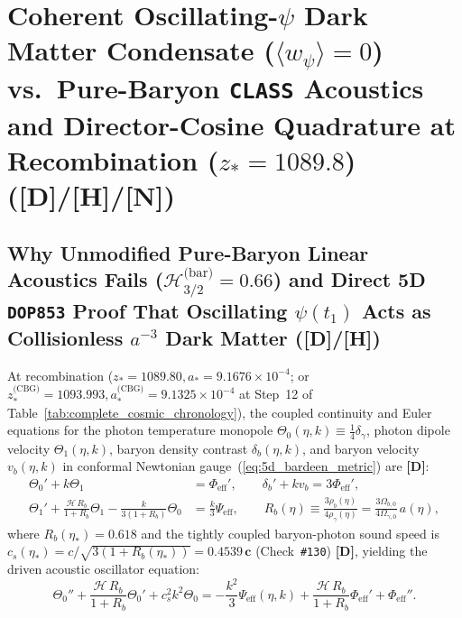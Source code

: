 \documentclass[11pt,a4paper]{article}
\newcommand{\catD}{\textbf{\textcolor{blue!75!black}{[D]}}}
\newcommand{\catH}{\textbf{\textcolor{orange!85!black}{[H]}}}
\newcommand{\catN}{\textbf{\textcolor{teal!75!black}{[N]}}}
\theoremstyle{plain}
\theoremstyle{definition}
\theoremstyle{remark}
\numberwithin{equation}{section}
\begin{document}
\section{\texorpdfstring{Coherent Oscillating-$\psi$ Dark Matter Condensate ($\langle w_{\psi}\rangle = 0$) vs.\ Pure-Baryon \texttt{CLASS} Acoustics and Director-Cosine Quadrature at Recombination ($z_* = 1089.8$) (\catD/\catH/\catN)}{Coherent Oscillating-psi Dark Matter Condensate vs. Pure-Baryon CLASS Acoustics and Director-Cosine Quadrature at Recombination}}

\subsection{\texorpdfstring{Why Unmodified Pure-Baryon Linear Acoustics Fails ($\mathcal{H}_{3/2}^{\text{(bar)}} = 0.66$) and Direct 5D \texttt{DOP853} Proof That Oscillating $\psi(t_1)$ Acts as Collisionless $a^{-3}$ Dark Matter (\catD/\catH)}{Why Unmodified Pure-Baryon Linear Acoustics Fails and Direct 5D DOP853 Proof That Oscillating psi(t_1) Acts as Collisionless a^-3 Dark Matter ([D]/[H])}}

At recombination ($z_* = 1089.80, a_* = 9.1676 \times 10^{-4}$; or $z_*^{\text{(CBG)}} = 1093.993, a_*^{\text{(CBG)}} = 9.1325 \times 10^{-4}$ at Step~12 of Table~\ref{tab:complete_cosmic_chronology}), the coupled continuity and Euler equations for the photon temperature monopole $\Theta_0(\eta, k) \equiv \frac{1}{4}\delta_\gamma$, photon dipole velocity $\Theta_1(\eta, k)$, baryon density contrast $\delta_b(\eta, k)$, and baryon velocity $v_b(\eta, k)$ in conformal Newtonian gauge~(\ref{eq:5d_bardeen_metric}) are \cite{hu1995} \catD:
\begin{subequations}
\label{eq:euler_boltzmann_system}
\begin{align}
\Theta_0' + k \Theta_1 &= \Phi_{\text{eff}}', \qquad \delta_b' + k v_b = 3\Phi_{\text{eff}}', \label{eq:eb_continuity} \\[4pt]
\Theta_1' + \frac{\mathcal{H}\,R_b}{1 + R_b}\Theta_1 - \frac{k}{3\left(1 + R_b\right)}\Theta_0 &= \frac{k}{3}\Psi_{\text{eff}}, \qquad R_b(\eta) \equiv \frac{3\rho_b(\eta)}{4\rho_\gamma(\eta)} = \frac{3\Omega_{b,0}}{4\Omega_{\gamma,0}}\,a(\eta),
\label{eq:eb_euler}
\end{align}
\end{subequations}
where $R_b(\eta_*) = 0.618$ and the tightly coupled baryon-photon sound speed is $c_s(\eta_*) = c/\sqrt{3(1+R_b(\eta_*))} = \mathbf{0.4539\,c}$ (Check~\texttt{\#130}) \catD, yielding the driven acoustic oscillator equation:
\begin{equation}
\Theta_0'' + \frac{\mathcal{H}\,R_b}{1 + R_b}\Theta_0' + c_s^2 k^2 \Theta_0 = -\frac{k^2}{3}\Psi_{\text{eff}}(\eta, k) + \frac{\mathcal{H}\,R_b}{1 + R_b}\Phi_{\text{eff}}' + \Phi_{\text{eff}}''.
\label{eq:driven_acoustic_oscillator}
\end{equation}
\end{document}
